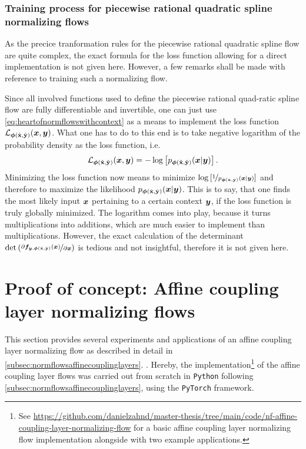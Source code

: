 \documentclass[a4paper,11pt]{report}
\def\lk#1{{\color{black}{#1}}}
\begin{document}
\subsection{Training process for piecewise rational quadratic spline normalizing flows}
As the precice tranformation rules for the piecewise rational quadratic spline flow are quite complex, the exact formula for the loss function allowing for a direct implementation is not given here. However, a few remarks shall be made with reference to training such a normalizing flow.

Since all involved functions used to define the piecewise rational quad-ratic spline flow are fully differentiable and invertible, one can just use \cref{eq:heartofnormflowswithcontext} as a means to implement the loss function $\mathcal{L}_{\bm{\phi}(\hat{\boldsymbol{\mathbf{x}}},\hat{\boldsymbol{\mathbf{y}}})}(\bm{x},\bm{y})$. What one has to do to this end is to take negative logarithm of the probability density \lk{$p_{\vect{\phi}(\hat{\matr{x}},\hat{\matr{y}})}(\vect{x}|\vect{y})$} as the loss function, i.e. \begin{equation}
\mathcal{L}_{\bm{\phi}(\hat{\boldsymbol{\mathbf{x}}},\hat{\boldsymbol{\mathbf{y}}})}(\bm{x},\bm{y}) = -\log\left[p_{\bm{\phi}(\hat{\boldsymbol{\mathbf{x}}},\hat{\boldsymbol{\mathbf{y}}})}(\bm{x}|\bm{y})\right].
\end{equation} Minimizing the loss function now means to minimize $\log\left[\nicefrac{1 }{p_{\bm{\phi}(\hat{\boldsymbol{\mathbf{x}}},\hat{\boldsymbol{\mathbf{y}}})}(\bm{x}|\bm{y})}\right]$ and therefore to maximize the likelihood $p_{\vect{\phi}(\hat{\matr{x}},\hat{\matr{y}})}(\vect{x}|\vect{y})$. This is to say, that one finds the most likely input $\bm{x}$ pertaining to a certain context $\bm{y}$, if the loss function is truly globally minimized. The logarithm comes into play, because it turns multiplications into additions, which are much easier to implement than multiplications. However, the exact calculation of the determinant $\det\left(\nicefrac{\partial \bm{f}_{\bm{y},\bm{\phi}(\hat{\boldsymbol{\mathbf{x}}},\hat{\boldsymbol{\mathbf{y}}})}(\bm{x})}{\partial \bm{x}}\right)$ is tedious and not insightful, therefore it is not given here.

\chapter{Proof of concept: Affine coupling layer normalizing flows}\label{chap:proofofconcept}
This section provides several experiments and applications of an affine coupling layer normalizing flow as described in detail in \cref{subsec:normflowsaffinecouplinglayers}. \lk{These experiments are intended to serve as a proof of concept to demonstrate the applicability of normalizing flows to tasks of increasing complexity}. Hereby, the implementation\footnote{See \url{https://github.com/danielzahnd/master-thesis/tree/main/code/nf-affine-coupling-layer-normalizing-flow} for a basic affine coupling layer normalizing flow implementation alongside with two example applications.} of the affine coupling layer flows was carried out from scratch in \verb|Python| following \cref{subsec:normflowsaffinecouplinglayers}, using the \verb|PyTorch| framework.
\end{document}
